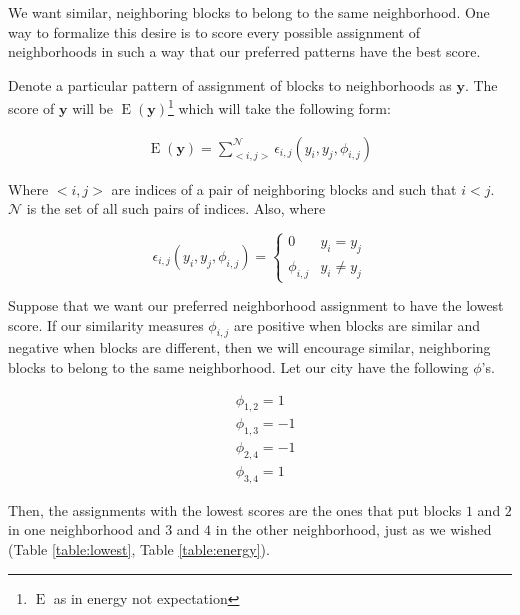 We want similar, neighboring blocks to belong to the same
neighborhood. One way to formalize this desire is to score every possible
assignment of neighborhoods in such a way that our preferred patterns
have the best score.

Denote a particular pattern of assignment of blocks to neighborhoods
as $\mathbf{y}$.  The score of $\mathbf{y}$ will be
$\operatorname{E}(\mathbf{y})$\footnote{$\operatorname{E}$ as in
  energy not expectation} which will take the following form:

\begin{align}
\operatorname{E}(\mathbf{y}) = \sum_{<i,j>}^{\mathcal{N}}\epsilon_{i,j}(y_i,y_j,\phi_{i,j})
\end{align}

Where $<i,j>$ are indices of a pair of neighboring blocks and such
that $i < j$.  $\mathcal{N}$ is the set of all such pairs of indices.
Also, where

\begin{equation}
\epsilon_{i,j}(y_i,y_j,\phi_{i,j}) = \begin{cases}
  0 &y_i = y_j \\
  \phi_{i,j} &y_i \neq y_j
\end{cases}
\end{equation}

Suppose that we want our preferred neighborhood assignment to have the
lowest score. If our similarity measures $\phi_{i,j}$ are positive
when blocks are similar and negative when blocks are different, then
we will encourage similar, neighboring blocks to belong to the same
neighborhood. Let our city have the following $\phi$'s.

\begin{align*}
&\phi_{1,2} = 1 \\
&\phi_{1,3} = -1 \\
&\phi_{2,4} = -1 \\
&\phi_{3,4} = 1
\end{align*} 

Then, the assignments with the lowest scores are the ones that put
blocks $1$ and $2$ in one neighborhood and $3$ and $4$ in the other
neighborhood, just as we wished (Table \ref{table:lowest}, Table
\ref{table:energy}).

